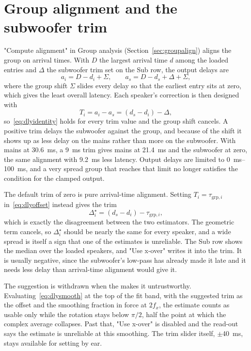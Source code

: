 \section{Group alignment and the subwoofer trim}
"Compute alignment" in Group analysis (Section~\ref{sec:groupalign}) aligns the group on arrival times. With $D$ the largest arrival time $d$ among the loaded entries and $\Delta$ the subwoofer trim set on the Sub row, the output delays are
\begin{equation}
  a_i = D - d_i + \Sigma, \qquad a_s = D - d_s + \Delta + \Sigma ,
  \label{eq:dlytrim}
\end{equation}
where the group shift $\Sigma$ slides every delay so that the earliest entry sits at zero, which gives the least overall latency. Each speaker's correction is then designed with
\begin{equation}
  T_i = a_i - a_s = (d_s - d_i) - \Delta ,
  \label{eq:dlyoffset}
\end{equation}
so~\eqref{eq:dlyidentity} holds for every trim value and the group shift cancels. A positive trim delays the subwoofer against the group, and because of the shift it shows up as less delay on the mains rather than more on the subwoofer. With mains at \SI{30.6}{\milli\second}, a \SI{9}{\milli\second} trim gives mains at \SI{21.4}{\milli\second} and the subwoofer at zero, the same alignment with \SI{9.2}{\milli\second} less latency. Output delays are limited to \SIrange{0}{100}{\milli\second}, and a very spread group that reaches that limit no longer satisfies the condition for the clamped output.

The default trim of zero is pure arrival-time alignment. Setting $T_i = \tau_{\mathrm{grp},i}$ in~\eqref{eq:dlyoffset} instead gives the trim
\begin{equation}
  \Delta_i^\star = (d_s - d_i) - \tau_{\mathrm{grp},i},
  \label{eq:dlysuggest}
\end{equation}
which is exactly the disagreement between the two estimators. The geometric term cancels, so $\Delta_i^\star$ should be nearly the same for every speaker, and a wide spread is itself a sign that one of the estimates is unreliable. The Sub row shows the median over the loaded speakers, and "Use x-over" writes it into the trim. It is usually negative, since the subwoofer's low-pass has already made it late and it needs less delay than arrival-time alignment would give it.

The suggestion is withdrawn when the  makes it untrustworthy. Evaluating~\eqref{eq:dlysmooth} at the top of the fit band, with the suggested trim as the offset and the smoothing fraction in force at $2f_x$, the estimate counts as usable only while the rotation stays below $\pi/2$, half the point at which the complex average collapses. Past that, "Use x-over" is disabled and the read-out says the estimate is unreliable at this smoothing. The trim slider itself, $\pm$\SI{40}{\milli\second}, stays available for setting by ear.
